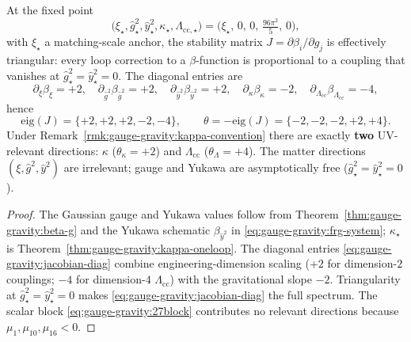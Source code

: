 \begin{proposition}
\label{prop:gauge-gravity:jacobian}
At the fixed point
\begin{equation}\label{eq:gauge-gravity:fpvalues}
  \bigl(\xi_\star,\hat g^2_\star,\hat y^2_\star,
        \kappa_\star,\Lambda_{\mathrm{cc},\star}\bigr)
  =\bigl(\xi_\star,\,0,\,0,\,\tfrac{96\pi^2}{5},\,0\bigr),
\end{equation}
with $\xi_\star$ a matching-scale anchor, the stability matrix
$J=\partial\beta_i/\partial g_j$ is effectively triangular: every loop
correction to a $\beta$-function is proportional to a coupling that
vanishes at $\hat g^2_\star=\hat y^2_\star=0$. The diagonal entries are
\begin{equation}\label{eq:gauge-gravity:jacobian-diag}
  \partial_{\xi}\beta_{\xi}=+2,\quad
  \partial_{\hat g^2}\beta_{\hat g^2}=+2,\quad
  \partial_{\hat y^2}\beta_{\hat y^2}=+2,\quad
  \partial_{\kappa}\beta_{\kappa}=-2,\quad
  \partial_{\Lambda_{\mathrm{cc}}}\beta_{\Lambda_{\mathrm{cc}}}=-4,
\end{equation}
hence
\begin{equation}\label{eq:gauge-gravity:jacobian-eig}
  \mathrm{eig}(J)=\{+2,+2,+2,-2,-4\},
  \qquad
  \theta=-\mathrm{eig}(J)=\{-2,-2,-2,+2,+4\}.
\end{equation}
Under Remark~\ref{rmk:gauge-gravity:kappa-convention} there are exactly
\textbf{two} UV-relevant directions: $\kappa$ ($\theta_\kappa=+2$) and
$\Lambda_{\mathrm{cc}}$ ($\theta_{\Lambda}=+4$). The matter directions
$(\xi,\hat g^2,\hat y^2)$ are irrelevant; gauge and Yukawa are
asymptotically free ($\hat g^2_\star=\hat y^2_\star=0$).
\end{proposition}

\begin{proof}
The Gaussian gauge and Yukawa values follow from
Theorem~\ref{thm:gauge-gravity:beta-g} and the Yukawa schematic
$\beta_{\hat y^2}$ in \eqref{eq:gauge-gravity:frg-system}; $\kappa_\star$
is Theorem~\ref{thm:gauge-gravity:kappa-oneloop}. The diagonal entries
\eqref{eq:gauge-gravity:jacobian-diag} combine engineering-dimension
scaling ($+2$ for dimension-$2$ couplings; $-4$ for dimension-$4$
$\Lambda_{\mathrm{cc}}$) with the gravitational slope $-2$. Triangularity
at $\hat g^2_\star=\hat y^2_\star=0$ makes \eqref{eq:gauge-gravity:jacobian-diag}
the full spectrum. The scalar block \eqref{eq:gauge-gravity:27block}
contributes no relevant directions because $\mu_{1},\mu_{10},\mu_{16}<0$.
\end{proof}

